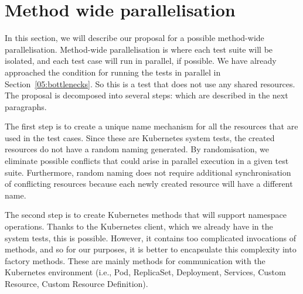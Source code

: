 \section{Method wide parallelisation}
\label{04:methodwideparalelisation}

In this section, we will describe our proposal for a possible method-wide parallelisation.
Method-wide parallelisation is where each test suite will be isolated, and each test case will run in parallel, if possible.
We have already approached the condition for running the tests in parallel in Section~\ref{05:bottlenecks}.
So this is a test that does not use any shared resources.
The proposal is decomposed into several steps: which are described in the next paragraphs.

The first step is to create a unique name mechanism for all the resources that are used in the test cases.
Since these are Kubernetes system tests, the created resources do not have a random naming generated.
By randomisation, we eliminate possible conflicts that could arise in parallel execution in a given test suite.
Furthermore, random naming does not require additional synchronisation of conflicting resources because each newly created resource will have a different name.

The second step is to create Kubernetes methods that will support namespace operations.
Thanks to the Kubernetes client, which we already have in the system tests, this is possible.
However, it contains too complicated invocations of methods, and so for our purposes, it is better to encapsulate this complexity into factory methods.
These are mainly methods for communication with the Kubernetes environment (i.e., Pod, ReplicaSet, Deployment, Services, Custom Resource, Custom Resource Definition).

